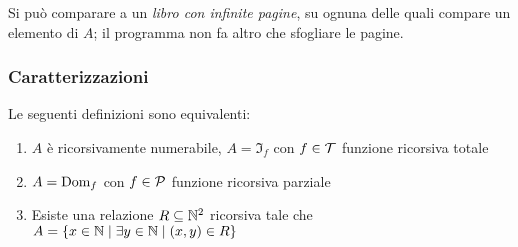 Si può comparare a un \textit{libro con infinite pagine}, su ognuna delle quali compare un elemento di $A$; il programma non fa altro che sfogliare le pagine. 

\subsubsection{Caratterizzazioni}

\begin{theor}
	Le seguenti definizioni sono equivalenti:
	\begin{enumerate}
		\item $A$ è ricorsivamente numerabile, $A = \Im_f$ con $f \in \mathcal{T}$ funzione ricorsiva totale
		
        \item $A = \text{Dom}_f$ con $f \in \mathcal{P}$ funzione ricorsiva parziale
		
        \item Esiste una relazione $R \subseteq \mathbb{N}^2$ ricorsiva tale che $A = \left\{x \in \mathbb{N} \mid \exists y \in \mathbb{N} \mid (x,y) \in R \right\}$
	\end{enumerate}
\end{theor}
